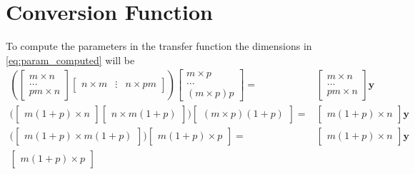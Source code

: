 \section{Conversion Function} %
\label{sec:conversion_function}
To compute the parameters in the transfer function the dimensions in \eqref{eq:param_computed} will be
\begin{equation}
	\begin{split}
		\left(  
	\begin{bmatrix}
		m \times n \\
		\dots \\
		pm \times n
	\end{bmatrix}
	\begin{bmatrix}
		n \times m & \vdots & n\times pm
	\end{bmatrix} \right)
	\begin{bmatrix}
		m \times p \\
		\dots \\
		\left(  m \times p \right) p
	\end{bmatrix}
	= & 
	\begin{bmatrix}
		m \times n \\
		\dots \\
		pm \times n
	\end{bmatrix} \mathbf{y}\\ %
	\biggl( \begin{bmatrix}
		m(1+p) \times n 
	\end{bmatrix}
	\begin{bmatrix}
		n \times m(1+p)
	\end{bmatrix} \biggr) 
	\begin{bmatrix}
		\left(  m \times p \right) (1+p)
	\end{bmatrix}
	= & 
	\begin{bmatrix}
		m(1+p) \times n 
	\end{bmatrix} \mathbf{y} \\ %
	\biggl( \begin{bmatrix}
		m(1+p) \times  m(1+p)
	\end{bmatrix} \biggr) 
	\begin{bmatrix}
		m (1+p) \times p 
	\end{bmatrix}
	= &
	\begin{bmatrix}
		m(1+p) \times n 
	\end{bmatrix} \mathbf{y} \\ %
	\begin{bmatrix}
		m (1+p) \times p
	\end{bmatrix}

\end{split}
\end{equation}

